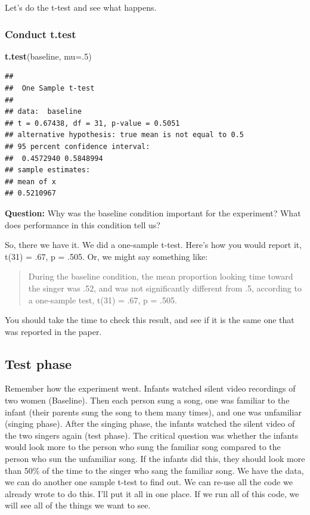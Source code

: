 \documentclass[]{book}
\newenvironment{Shaded}{\begin{snugshade}}{\end{snugshade}}
\newcommand{\KeywordTok}[1]{\textcolor[rgb]{0.13,0.29,0.53}{\textbf{#1}}}
\newcommand{\DataTypeTok}[1]{\textcolor[rgb]{0.13,0.29,0.53}{#1}}
\newcommand{\DecValTok}[1]{\textcolor[rgb]{0.00,0.00,0.81}{#1}}
\newcommand{\NormalTok}[1]{#1}
\begin{document}
Let's do the t-test and see what happens.

\subsubsection{Conduct t.test}\label{conduct-t.test}

\begin{Shaded}
\begin{Highlighting}[]
\KeywordTok{t.test}\NormalTok{(baseline, }\DataTypeTok{mu=}\NormalTok{.}\DecValTok{5}\NormalTok{)}
\end{Highlighting}
\end{Shaded}

\begin{verbatim}
## 
##  One Sample t-test
## 
## data:  baseline
## t = 0.67438, df = 31, p-value = 0.5051
## alternative hypothesis: true mean is not equal to 0.5
## 95 percent confidence interval:
##  0.4572940 0.5848994
## sample estimates:
## mean of x 
## 0.5210967
\end{verbatim}

\textbf{Question:} Why was the baseline condition important for the
experiment? What does performance in this condition tell us?

So, there we have it. We did a one-sample t-test. Here's how you would
report it, t(31) = .67, p = .505. Or, we might say something like:

\begin{quote}
During the baseline condition, the mean proportion looking time toward
the singer was .52, and was not significantly different from .5,
according to a one-sample test, t(31) = .67, p = .505.
\end{quote}

You should take the time to check this result, and see if it is the same
one that was reported in the paper.

\subsection{Test phase}\label{test-phase}

Remember how the experiment went. Infants watched silent video
recordings of two women (Baseline). Then each person sung a song, one
was familiar to the infant (their parents sung the song to them many
times), and one was unfamiliar (singing phase). After the singing phase,
the infants watched the silent video of the two singers again (test
phase). The critical question was whether the infants would look more to
the person who sung the familiar song compared to the person who sun the
unfamiliar song. If the infants did this, they should look more than
50\% of the time to the singer who sang the familiar song. We have the
data, we can do another one sample t-test to find out. We can re-use all
the code we already wrote to do this. I'll put it all in one place. If
we run all of this code, we will see all of the things we want to see.
\end{document}
